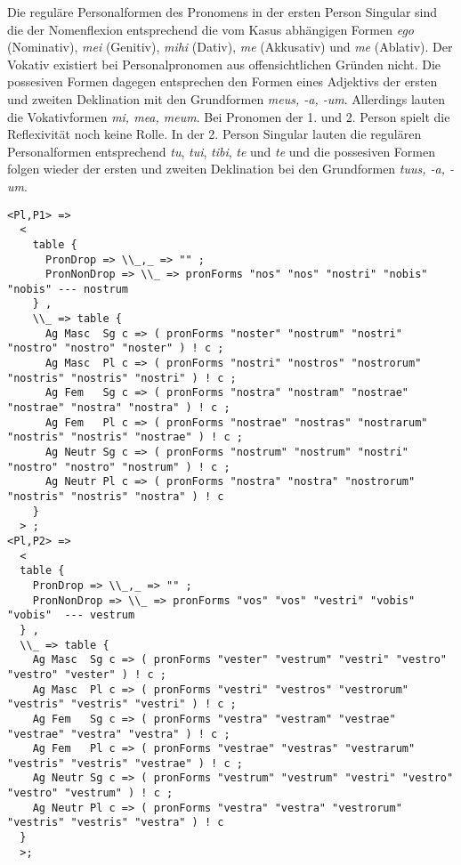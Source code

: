Die reguläre Personalformen des Pronomens in der ersten Person Singular sind die der Nomenflexion entsprechend die vom Kasus abhängigen Formen \textit{ego} (Nominativ), \textit{mei} (Genitiv), \textit{mihi} (Dativ), \textit{me} (Akkusativ) und \textit{me} (Ablativ). Der Vokativ existiert bei Personalpronomen aus offensichtlichen Gründen nicht. Die possesiven Formen dagegen entsprechen den Formen eines Adjektivs der ersten und zweiten Deklination mit den Grundformen \textit{meus, -a, -um}. Allerdings lauten die Vokativformen \textit{mi, mea, meum}. Bei Pronomen der 1. und 2. Person spielt die Reflexivität noch keine Rolle. In der 2. Person Singular lauten die regulären Personalformen entsprechend \textit{tu}, \textit{tui}, \textit{tibi}, \textit{te} und \textit{te} und die possesiven Formen folgen wieder der ersten und zweiten Deklination bei den Grundformen \textit{tuus, -a, -um}. \par
\begin{lstlisting}[float=h!tp,caption={Ausschnitt aus der Funktion \texttt{mkPronoun} für 1. und 2. Person Plural (vgl. \textbf{ResLat.gf})},label={GF-Res-MkPronoun-1u2Pl},basicstyle=\small]
<Pl,P1> => 
  < 
    table { 
      PronDrop => \\_,_ => "" ;
      PronNonDrop => \\_ => pronForms "nos" "nos" "nostri" "nobis" "nobis" --- nostrum
    } , 
    \\_ => table {
      Ag Masc  Sg c => ( pronForms "noster" "nostrum" "nostri" "nostro" "nostro" "noster" ) ! c ; 
      Ag Masc  Pl c => ( pronForms "nostri" "nostros" "nostrorum" "nostris" "nostris" "nostri" ) ! c ;
      Ag Fem   Sg c => ( pronForms "nostra" "nostram" "nostrae" "nostrae" "nostra" "nostra" ) ! c ;
      Ag Fem   Pl c => ( pronForms "nostrae" "nostras" "nostrarum" "nostris" "nostris" "nostrae" ) ! c ;
      Ag Neutr Sg c => ( pronForms "nostrum" "nostrum" "nostri" "nostro" "nostro" "nostrum" ) ! c ;
      Ag Neutr Pl c => ( pronForms "nostra" "nostra" "nostrorum" "nostris" "nostris" "nostra" ) ! c
    }
  > ; 
<Pl,P2> => 
  < 
  table {
    PronDrop => \\_,_ => "" ; 
    PronNonDrop => \\_ => pronForms "vos" "vos" "vestri" "vobis" "vobis"  --- vestrum
  } ,
  \\_ => table {
    Ag Masc  Sg c => ( pronForms "vester" "vestrum" "vestri" "vestro" "vestro" "vester" ) ! c ;
    Ag Masc  Pl c => ( pronForms "vestri" "vestros" "vestrorum" "vestris" "vestris" "vestri" ) ! c ;
    Ag Fem   Sg c => ( pronForms "vestra" "vestram" "vestrae" "vestrae" "vestra" "vestra" ) ! c ;
    Ag Fem   Pl c => ( pronForms "vestrae" "vestras" "vestrarum" "vestris" "vestris" "vestrae" ) ! c ;
    Ag Neutr Sg c => ( pronForms "vestrum" "vestrum" "vestri" "vestro" "vestro" "vestrum" ) ! c ;
    Ag Neutr Pl c => ( pronForms "vestra" "vestra" "vestrorum" "vestris" "vestris" "vestra" ) ! c
  }
  >;
\end{lstlisting}
